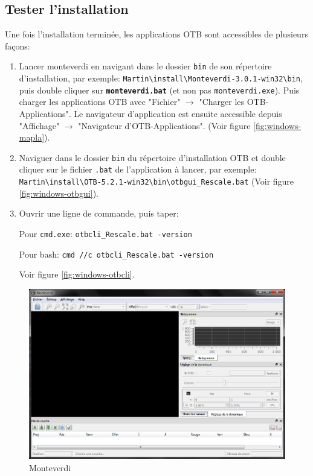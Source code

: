 \documentclass[10pt,a4paper]{article}
\begin{document}
\subsection{Tester l'installation}
Une fois l'installation terminée, les applications OTB sont accessibles de
plusieurs façons:
\begin{enumerate}

  \item Lancer monteverdi en navigant dans le dossier \texttt{bin} de son répertoire
d'installation, par exemple:
\texttt{Martin{\textbackslash}install{\textbackslash}Monteverdi-3.0.1-win32{\textbackslash}bin},
puis double cliquer sur \textbf{\texttt{monteverdi.bat}} (et non pas
\texttt{monteverdi.exe}).
Puis charger les applications OTB avec "Fichier" $\rightarrow$ "Charger les
OTB-Applications".
Le navigateur d'application est ensuite accessible depuis "Affichage"
$\rightarrow$ "Navigateur d'OTB-Applications".
(Voir figure \ref{fig:windows-mapla}).

  \item Naviguer dans le dossier \texttt{bin} du répertoire d'installation OTB et double cliquer sur le
  fichier \texttt{.bat} de l'application à lancer, par exemple:\\
  \texttt{Martin{\textbackslash}install{\textbackslash}OTB-5.2.1-win32{\textbackslash}bin{\textbackslash}otbgui\_Rescale.bat}
  (Voir figure \ref{fig:windows-otbgui}).

  \item Ouvrir une ligne de commande, puis taper:

    Pour \texttt{cmd.exe}: \texttt{otbcli\_Rescale.bat -version}

    Pour bash: \texttt{cmd //c otbcli\_Rescale.bat -version}

    Voir figure \ref{fig:windows-otbcli}.

\end{enumerate}

\begin{figure}[h]
  \center
  \includegraphics[width=1\textwidth]{Art/windows-monteverdi.png}
  \caption[]{Monteverdi}
  \label{fig:windows-monteverdi}
\end{figure}
\end{document}
